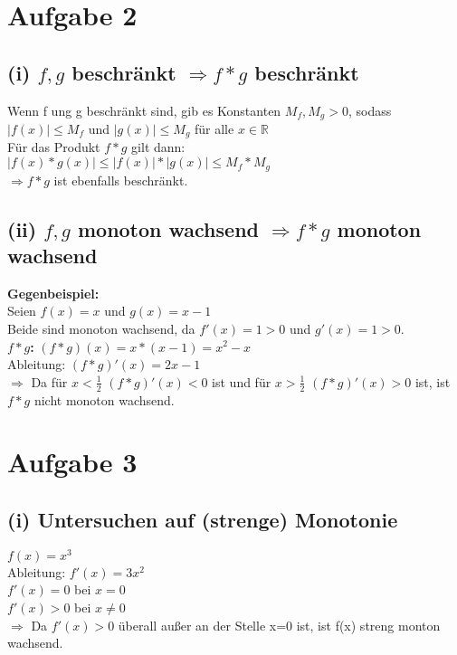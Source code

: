 \documentclass{article}
\begin{document}
\section{Aufgabe 2}
\subsection{(i) $f,g$ beschränkt $\Longrightarrow f*g$ beschränkt}
\begin{center}
    Wenn f ung g beschränkt sind, gib es Konstanten $M_f, M_g > 0$, sodass \\
    $|f(x)| \leq M_f$ und $|g(x)| \leq M_g$ für alle $x \in \mathbb{R}$ \\
    Für das Produkt $f*g$ gilt dann: \\
    $|f(x)*g(x)| \leq |f(x)|*|g(x)| \leq M_f*M_g$ \\
    $\Longrightarrow f*g$ ist ebenfalls beschränkt.
\end{center}

\subsection{(ii) $f,g$ monoton wachsend $\Longrightarrow f*g$ monoton wachsend}
\begin{center}
    \textbf{Gegenbeispiel:} \\
    Seien $f(x)=x$ und $g(x)=x-1$ \\
    Beide sind monoton wachsend, da $f'(x)=1 > 0$ und $g'(x)=1 > 0$. \\
    \textbf{$f*g$:} $(f*g)(x)=x*(x-1)=x^2-x$ \\
    Ableitung: $(f*g)'(x)=2x-1$\\
    $\Longrightarrow$ Da für $x<\frac{1}{2}$ $(f*g)'(x)<0$ ist und für  $x>\frac{1}{2}$ $(f*g)'(x)>0$ ist, ist $f*g$ nicht monoton wachsend.
\end{center}

\section{Aufgabe 3}
\subsection{(i) Untersuchen auf (strenge) Monotonie}
\begin{center}
$f(x)=x^3$ \\
Ableitung: $f'(x)=3x^2$ \\
$f'(x) = 0$ bei $x=0$ \\
$f'(x) > 0$ bei $x \neq 0$ \\
$\Longrightarrow$ Da $f'(x)>0$ überall außer an der Stelle x=0 ist, ist f(x) streng monton wachsend.
\end{center}
\end{document}
